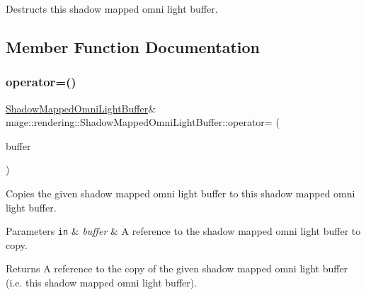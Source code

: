 Destructs this shadow mapped omni light buffer. 

\subsection{Member Function Documentation}
\mbox{\label{structmage_1_1rendering_1_1_shadow_mapped_omni_light_buffer_ae43119f667592aea06f73532a9c9b742}} 
\subsubsection{\texorpdfstring{operator=()}{operator=()}\hspace{0.1cm}{\footnotesize\ttfamily [1/2]}}
{\footnotesize\ttfamily \mbox{\hyperlink{structmage_1_1rendering_1_1_shadow_mapped_omni_light_buffer}{Shadow\+Mapped\+Omni\+Light\+Buffer}}\& mage\+::rendering\+::\+Shadow\+Mapped\+Omni\+Light\+Buffer\+::operator= (\begin{DoxyParamCaption}\item[{const \mbox{\hyperlink{structmage_1_1rendering_1_1_shadow_mapped_omni_light_buffer}{Shadow\+Mapped\+Omni\+Light\+Buffer}} \&}]{buffer }\end{DoxyParamCaption})\hspace{0.3cm}{\ttfamily [default]}}

Copies the given shadow mapped omni light buffer to this shadow mapped omni light buffer.


\begin{DoxyParams}[1]{Parameters}
\mbox{\tt in}  & {\em buffer} & A reference to the shadow mapped omni light buffer to copy. \\
\hline
\end{DoxyParams}
\begin{DoxyReturn}{Returns}
A reference to the copy of the given shadow mapped omni light buffer (i.\+e. this shadow mapped omni light buffer). 
\end{DoxyReturn}
\mbox{\label{structmage_1_1rendering_1_1_shadow_mapped_omni_light_buffer_a5605852385a384c28a4c0cee6bc3cc32}} 
